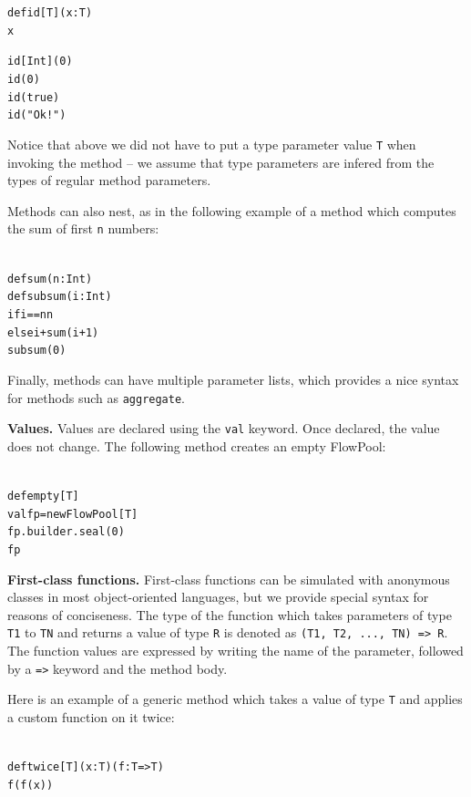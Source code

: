 \documentclass[runningheads,a4paper]{llncs}
\begin{document}
\begin{minipage}[b]{3.75 cm}
\begin{alltt}
{\scriptsize
def id[T](x: T)
  x

id[Int](0)
id(0)
id(true)
id("Ok!")
}
\end{alltt}
\end{minipage}

Notice that above we did not have to put a type parameter value \verb=T= when
invoking the method -- we assume that type parameters are infered from the
types of regular method parameters.

Methods can also nest, as in the following example of a method which computes
the sum of first \verb=n= numbers:

\begin{minipage}[b]{3.75 cm}
\begin{alltt}
{\scriptsize
def sum(n: Int)
  def subsum(i: Int)
    if i == n n
    else i + sum(i + 1)
  subsum(0)
}
\end{alltt}
\end{minipage}

Finally, methods can have multiple parameter lists, which provides a nice syntax
for methods such as \verb=aggregate=.


\textbf{Values.}
Values are declared using the \verb=val= keyword.
Once declared, the value does not change.
The following method creates an empty FlowPool:

\begin{minipage}[b]{3.75 cm}
\begin{alltt}
{\scriptsize
def empty[T]
  val fp = new FlowPool[T]
  fp.builder.seal(0)
  fp
}
\end{alltt}
\end{minipage}

\textbf{First-class functions.}
First-class functions can be simulated with anonymous classes in most object-oriented
languages, but we provide special syntax for reasons of conciseness.
The type of the function which takes parameters of type \verb=T1= to \verb=TN= and
returns a value of type \verb=R= is denoted as \verb+(T1, T2, ..., TN) => R+.
The function values are expressed by writing the name of the parameter, followed by
a \verb+=>+ keyword and the method body.

Here is an example of a generic method which takes a value of type \verb=T= and
applies a custom function on it twice:

\begin{minipage}[b]{3.75 cm}
\begin{alltt}
{\scriptsize
def twice[T](x: T)(f: T => T)
  f(f(x))
}
\end{alltt}
\end{minipage}
\end{document}
